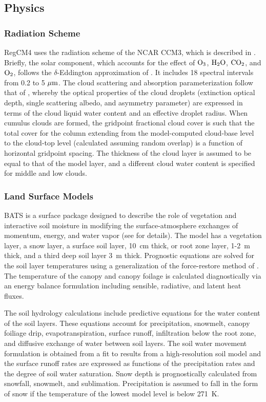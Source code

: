 \newpage \subsection{Physics} \label{sec:physics}

\subsubsection{Radiation Scheme} \noindent RegCM4 uses the radiation scheme of
the NCAR CCM3, which is described in \cite{Kiehl_96}.  Briefly, the solar
component, which accounts for the effect of ${\rm O_3}$, ${\rm H_2O}$, ${\rm
CO_2}$, and ${\rm O_2}$, follows the $\delta$-Eddington approximation of
\cite{Kiehl_96}.  It includes 18 spectral intervals from 0.2 to 5 $\mu {\rm m}$.
The cloud scattering and absorption parameterization follow that of
\cite{Slingo_89}, whereby the optical properties of the cloud droplets
(extinction optical depth, single scattering albedo, and asymmetry parameter)
are expressed in terms of the cloud liquid water content and an effective
droplet radius.  When cumulus clouds are formed, the gridpoint fractional cloud
cover is such that the total cover for the column extending from the
model-computed cloud-base level to the cloud-top level (calculated assuming
random overlap) is a function of horizontal gridpoint spacing.  The thickness of
the cloud layer is assumed to be equal to that of the model layer, and a
different cloud water content is specified for middle and low clouds.

\subsubsection{Land Surface Models}

 BATS is a surface package designed to describe
the role of vegetation and interactive soil moisture in modifying the
surface-atmosphere exchanges of momentum, energy, and water vapor (see
\cite{Dickinson_93} for details).  The model has a vegetation layer, a snow
layer, a surface soil layer, 10~cm thick, or root zone layer, 1-2~m thick, and a
third deep soil layer 3~m thick.  Prognostic equations are solved for the soil
layer temperatures using a generalization of the force-restore method of
\cite{Deardoff_78}.  The temperature of the canopy and canopy foilage is
calculated diagnostically via an energy balance formulation including sensible,
radiative, and latent heat fluxes.

The soil hydrology calculations include predictive equations for the water
content of the soil layers.  These equations account for precipitation,
snowmelt, canopy foiliage drip, evapotranspiration, surface runoff, infiltration
below the root zone, and diffusive exchange of water between soil layers.  The
soil water movement formulation is obtained from a fit to results from a
high-resolution soil model \cite{Dickinson_84} and the surface runoff rates are
expressed as functions of the precipitation rates and the degree of soil water
saturation.  Snow depth is prognostically calculated from snowfall, snowmelt,
and sublimation.  Precipitation is assumed to fall in the form of snow if the
temperature of the lowest model level is below 271~K.

